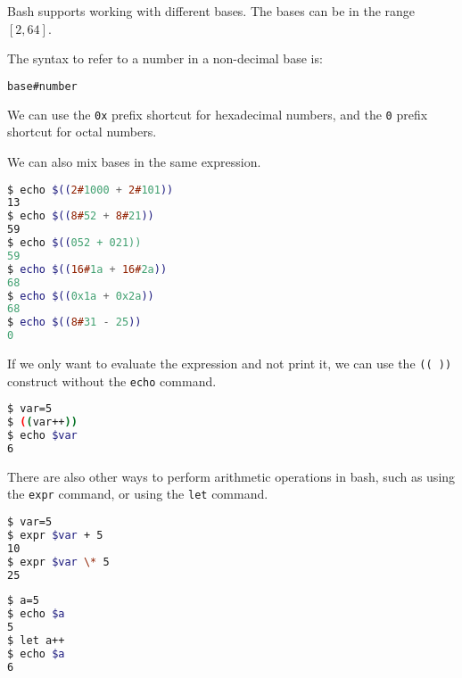 Bash supports working with different bases.
The bases can be in the range $[2, 64]$.

The syntax to refer to a number in a non-decimal base is:

\begin{lstlisting}[language=bash]
base#number
\end{lstlisting}

We can use the \lstinline{0x} prefix shortcut for hexadecimal numbers, and the \lstinline{0} prefix shortcut for octal numbers.

We can also mix bases in the same expression.

\begin{lstlisting}[language=bash]
$ echo $((2#1000 + 2#101))
13
$ echo $((8#52 + 8#21))
59
$ echo $((052 + 021))
59
$ echo $((16#1a + 16#2a))
68
$ echo $((0x1a + 0x2a))
68
$ echo $((8#31 - 25))
0
\end{lstlisting}

If we only want to evaluate the expression and not print it, we can use the \lstinline{(( ))} construct without the \lstinline{echo} command.

\begin{lstlisting}[language=bash]
$ var=5
$ ((var++))
$ echo $var
6
\end{lstlisting}

There are also other ways to perform arithmetic operations in bash, such as using the \lstinline{expr} command, or using the \lstinline{let} command.

\begin{lstlisting}[language=bash]
$ var=5
$ expr $var + 5
10
$ expr $var \* 5
25
\end{lstlisting}

\begin{lstlisting}[language=bash]
$ a=5
$ echo $a
5
$ let a++
$ echo $a
6
\end{lstlisting}

